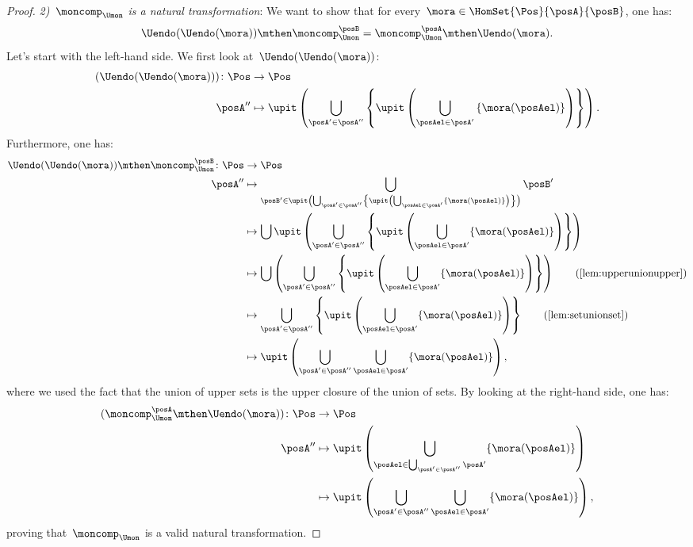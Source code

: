 \begin{proof}
    \emph{2)~$\moncomp_{\Umon}$ is a natural transformation}:
    We want to show that for every~$\mora\in \HomSet{\Pos}{\posA}{\posB}$, one has:
    \begin{equation}
        \Uendo(\Uendo(\mora))\mthen \moncomp_{\Umon}^{\posB}=\moncomp_{\Umon}^\posA \mthen \Uendo(\mora).
    \end{equation}
    Let's start with the left-hand side. We first look at~$\Uendo(\Uendo(\mora))$:
    \begin{equation}
        \begin{aligned}
        (\Uendo(\Uendo(\mora)))
            \colon \Pos&\to \Pos\\
            \posA''&\mapsto \upit \left( \bigcup_{\posA' \in \posA''}\left \{ \upit \left( \bigcup_{\posAel \in \posA'} \left\{ \mora(\posAel)\right\}\right)\right\}\right).
        \end{aligned}
    \end{equation}
    Furthermore, one has:
    \begin{equation}
        \begin{aligned}
            \Uendo(\Uendo(\mora))\mthen \moncomp_{\Umon}^{\posB}\colon \Pos&\to \Pos\\
            \posA''&\mapsto \bigcup_{\posB'\in \upit \left( \bigcup_{\posA'\in \posA''} \left\{ \upit \left( \bigcup_{\posAel \in \posA'} \{ \mora(\posAel)\}\right)\right\} \right)} \posB'\\
            &\mapsto \bigcup \upit \left( \bigcup_{\posA'\in \posA''} \left\{ \upit \left( \bigcup_{\posAel \in \posA'} \{ \mora(\posAel)\}\right)\right\} \right)\\
            &\mapsto \bigcup  \left( \bigcup_{\posA'\in \posA''} \left\{ \upit \left( \bigcup_{\posAel \in \posA'} \{ \mora(\posAel)\}\right)\right\} \right) \quad \quad (\text{\cref{lem:upperunionupper}})\\
            &\mapsto   \bigcup_{\posA'\in \posA''} \left\{ \upit \left( \bigcup_{\posAel \in \posA'} \{ \mora(\posAel)\}\right)\right\} \quad \quad (\text{\cref{lem:setunionset}})\\
            &\mapsto   \upit \left(\bigcup_{\posA'\in \posA''}  \bigcup_{\posAel \in \posA'} \{ \mora(\posAel)\}\right),
        \end{aligned}
    \end{equation}
    where we used the fact that the union of upper sets is the upper closure of the union of sets. By looking at the right-hand side, one has:
    \begin{equation}
        \begin{aligned}
        (\moncomp_{\Umon}^\posA \mthen \Uendo(\mora))
            \colon \Pos &\to \Pos\\
            \posA''&\mapsto \upit \left( \bigcup_{\posAel \in \bigcup_{\posA'\in \posA''}\posA'} \{ \mora(\posAel)\}\right)\\
            &\mapsto \upit \left( \bigcup_{\posA'\in \posA''}\bigcup_{\posAel \in \posA'}\{\mora(\posAel)\}\right),
        \end{aligned}
    \end{equation}
    proving that~$\moncomp_{\Umon}$ is a valid natural transformation.


\end{proof}
